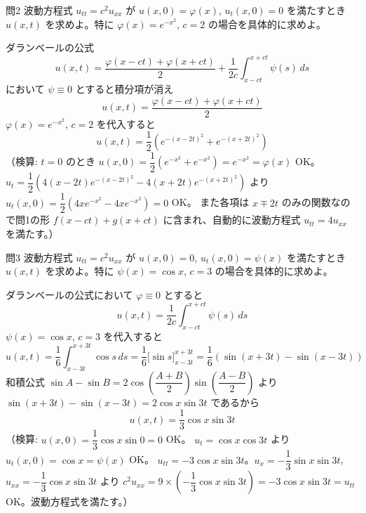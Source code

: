 \documentclass[a4paper,11pt]{article}
\begin{document}
\clearpage
\begin{mondaiboxS}{問2}
波動方程式 $u_{tt} = c^{2}u_{xx}$ が $u(x,0) = \varphi(x)$, $u_{t}(x,0) = 0$ を満たすとき $u(x,t)$ を求めよ。特に $\varphi(x) = e^{-x^{2}}$, $c=2$ の場合を具体的に求めよ。
\end{mondaiboxS}
\kaitou
ダランベールの公式
\[
u(x,t) = \frac{\varphi(x-ct) + \varphi(x+ct)}{2} + \frac{1}{2c}\int_{x-ct}^{x+ct} \psi(s)\,ds
\]
において $\psi \equiv 0$ とすると積分項が消え
\[
\boxed{\; u(x,t) = \frac{\varphi(x-ct) + \varphi(x+ct)}{2} \;}
\]
$\varphi(x) = e^{-x^{2}}$, $c = 2$ を代入すると
\[
\boxed{\; u(x,t) = \frac{1}{2}\left(e^{-(x-2t)^{2}} + e^{-(x+2t)^{2}}\right) \;}
\]
（検算: $t=0$ のとき $u(x,0) = \dfrac{1}{2}(e^{-x^2}+e^{-x^2}) = e^{-x^2} = \varphi(x)$ OK。
$u_t = \dfrac{1}{2}\left(4(x-2t)e^{-(x-2t)^2} - 4(x+2t)e^{-(x+2t)^2}\right)$ より $u_t(x,0) = \dfrac{1}{2}(4xe^{-x^2}-4xe^{-x^2}) = 0$ OK。
また各項は $x\mp 2t$ のみの関数なので問1の形 $f(x-ct)+g(x+ct)$ に含まれ、自動的に波動方程式 $u_{tt}=4u_{xx}$ を満たす。）

\clearpage
\begin{mondaiboxS}{問3}
波動方程式 $u_{tt} = c^{2}u_{xx}$ が $u(x,0) = 0$, $u_{t}(x,0) = \psi(x)$ を満たすとき $u(x,t)$ を求めよ。特に $\psi(x) = \cos x$, $c=3$ の場合を具体的に求めよ。
\end{mondaiboxS}
\kaitou
ダランベールの公式において $\varphi \equiv 0$ とすると
\[
\boxed{\; u(x,t) = \frac{1}{2c}\int_{x-ct}^{x+ct} \psi(s)\,ds \;}
\]
$\psi(x) = \cos x$, $c = 3$ を代入すると
\[
u(x,t) = \frac{1}{6}\int_{x-3t}^{x+3t} \cos s\,ds
= \frac{1}{6}\Big[\sin s\Big]_{x-3t}^{x+3t}
= \frac{1}{6}\left(\sin(x+3t) - \sin(x-3t)\right)
\]
和積公式 $\sin A - \sin B = 2\cos\left(\dfrac{A+B}{2}\right)\sin\left(\dfrac{A-B}{2}\right)$ より $\sin(x+3t)-\sin(x-3t) = 2\cos x \sin 3t$ であるから
\[
\boxed{\; u(x,t) = \frac{1}{3}\cos x \sin 3t \;}
\]
（検算: $u(x,0) = \dfrac{1}{3}\cos x \sin 0 = 0$ OK。
$u_t = \cos x \cos 3t$ より $u_t(x,0) = \cos x = \psi(x)$ OK。
$u_{tt} = -3\cos x \sin 3t$。$u_x = -\dfrac{1}{3}\sin x \sin 3t$, $u_{xx} = -\dfrac{1}{3}\cos x \sin 3t$ より $c^{2}u_{xx} = 9 \times \left(-\dfrac{1}{3}\cos x \sin 3t\right) = -3\cos x \sin 3t = u_{tt}$ OK。波動方程式を満たす。）
\end{document}
